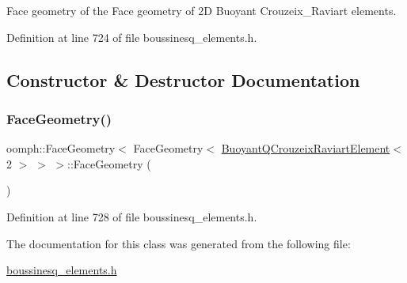 Face geometry of the Face geometry of 2D Buoyant Crouzeix\+\_\+\+Raviart elements. 

Definition at line 724 of file boussinesq\+\_\+elements.\+h.



\subsection{Constructor \& Destructor Documentation}
\mbox{\label{classoomph_1_1FaceGeometry_3_01FaceGeometry_3_01BuoyantQCrouzeixRaviartElement_3_012_01_4_01_4_01_4_af5838040ad0b4b6d95435e65abc2888c}} 
\subsubsection{\texorpdfstring{Face\+Geometry()}{FaceGeometry()}}
{\footnotesize\ttfamily oomph\+::\+Face\+Geometry$<$ Face\+Geometry$<$ \hyperlink{classoomph_1_1BuoyantQCrouzeixRaviartElement}{Buoyant\+Q\+Crouzeix\+Raviart\+Element}$<$ 2 $>$ $>$ $>$\+::Face\+Geometry (\begin{DoxyParamCaption}{ }\end{DoxyParamCaption})\hspace{0.3cm}{\ttfamily [inline]}}



Definition at line 728 of file boussinesq\+\_\+elements.\+h.



The documentation for this class was generated from the following file\+:\begin{DoxyCompactItemize}
\item 
\hyperlink{boussinesq__elements_8h}{boussinesq\+\_\+elements.\+h}\end{DoxyCompactItemize}

